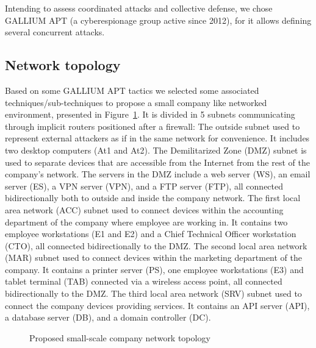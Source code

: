 \documentclass[conference]{IEEEtran}
\newcommand{\rem}[1]{\textcolor{red}{#1}}
\begin{document}
\noindent
Intending to assess coordinated attacks and collective defense, we chose GALLIUM APT (a cyberespionage group active since 2012), for it allows defining several concurrent attacks.


\subsection{Network topology}


\noindent
Based on some GALLIUM APT tactics we selected some associated techniques/sub-techniques to propose a small company like networked environment, presented in Figure~\ref{fig:scenario_network_topology}. It is divided in 5 subnets communicating through implicit routers positioned after a firewall:
The outside subnet used to represent external attackers as if in the same network for convenience. It includes two desktop computers (At1 and At2).
The Demilitarized Zone (DMZ) subnet is used to separate devices that are accessible from the Internet from the rest of the company's network. The servers in the DMZ include a web server (WS), an email server (ES), a VPN server (VPN), and a FTP server (FTP), all connected bidirectionally both to outside and inside the company network.
The first local area network (ACC) subnet used to connect devices within the accounting department of the company where employee are working in. It contains two employee workstations (E1 and E2) and a Chief Technical Officer workstation (CTO), all connected bidirectionally to the DMZ. %
The second local area network (MAR) subnet used to connect devices within the marketing department of the company. It contains a printer server (PS), one employee workstations (E3) and tablet terminal (TAB) connected via a wireless access point, all connected bidirectionally to the DMZ. %
The third local area network (SRV) subnet used to connect the company devices providing services. It contains an API server (API), a database server (DB), and a domain controller (DC).

\begin{figure}
    \centering
    
    \caption{Proposed small-scale company network topology}
    \label{fig:scenario_network_topology}
\end{figure}
\end{document}
